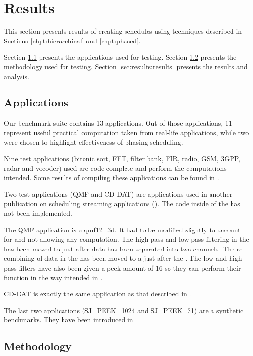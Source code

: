 \section{Results}
\label{chpt:results}

This section presents results of creating schedules using
techniques described in Sections \ref{chpt:hierarchical} and
\ref{chpt:phased}.

Section \ref{sec:results:apps} presents the applications used for
testing.  Section \ref{sec:results:methodology} presents the
methodology used for testing. Section \ref{sec:results:results}
presents the results and analysis.

\subsection{Applications}
\label{sec:results:apps}

Our benchmark suite contains 13 applications. Out of those
applications, 11 represent useful practical computation taken from
real-life applications, while two were chosen to highlight
effectiveness of phasing scheduling.

Nine test applications (bitonic sort, FFT, filter bank, FIR,
radio, GSM, 3GPP, radar and vocoder) used are code-complete and
perform the computations intended. Some results of compiling these
applications can be found in \cite{Gordo02}.

Two test applications (QMF and CD-DAT) are applications used in
another publication on scheduling streaming applications
(\cite{murthy99buffer}). The code inside of the {\filters} has not
been implemented.

The QMF application is a qmf12\_3d.  It had to be modified
slightly to account for {\StreamIt} {\splitters} and {\joiners}
not allowing any computation. The high-pass and low-pass filtering
in the {\splitters} has been moved to just after data has been
separated into two channels. The re-combining of data in the
{\joiners} has been moved to a {\filter} just after the
{\joiners}. The low and high pass filters have also been given a
peek amount of 16 so they can perform their function in the way
intended in {\StreamIt}.

CD-DAT is exactly the same application as that described in
\cite{murthy99buffer}.

The last two applications (SJ\_PEEK\_1024 and SJ\_PEEK\_31) are a
synthetic benchmarks. They have been introduced in
\cite{karczma-thesis}

\subsection{Methodology}
\label{sec:results:methodology}

